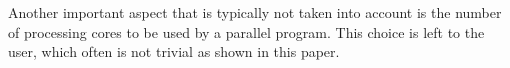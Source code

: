 Another important aspect that is typically not taken into account is the number of processing cores to be used by a parallel program. This choice is left to the user, which often is not trivial as shown in this paper.



